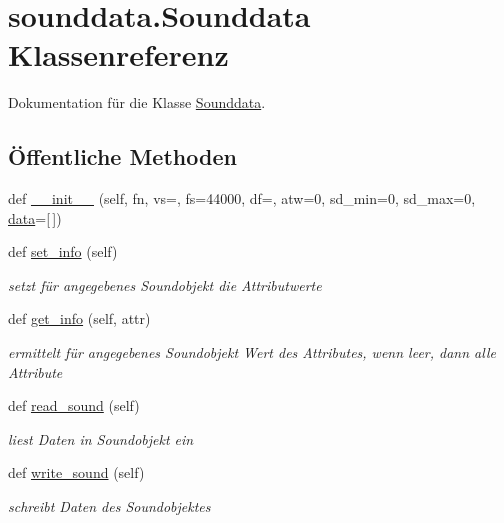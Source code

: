 \hypertarget{classsounddata_1_1_sounddata}{}\section{sounddata.\+Sounddata Klassenreferenz}
\label{classsounddata_1_1_sounddata}


Dokumentation für die Klasse \mbox{\hyperlink{classsounddata_1_1_sounddata}{Sounddata}}.  


\subsection*{Öffentliche Methoden}
\begin{DoxyCompactItemize}
\item 
def \mbox{\hyperlink{classsounddata_1_1_sounddata_a5bd8d7eebdf0bb0d137bfeb74b4c9fe6}{\+\_\+\+\_\+init\+\_\+\+\_\+}} (self, fn, vs=\textquotesingle{}\textquotesingle{}, fs=44000, df=\textquotesingle{}\textquotesingle{}, atw=0, sd\+\_\+min=0, sd\+\_\+max=0, \mbox{\hyperlink{classsounddata_1_1_sounddata_a64a625b1f08e5888cd34e14aad188cc0}{data}}=\mbox{[}$\,$\mbox{]})
\item 
def \mbox{\hyperlink{classsounddata_1_1_sounddata_a198de54d49c935b70cf8545980af1c26}{set\+\_\+info}} (self)
\begin{DoxyCompactList}\small\item\em setzt für angegebenes Soundobjekt die Attributwerte \end{DoxyCompactList}\item 
def \mbox{\hyperlink{classsounddata_1_1_sounddata_ac63cbec499bc5b28eced6ff6d0187376}{get\+\_\+info}} (self, attr)
\begin{DoxyCompactList}\small\item\em ermittelt für angegebenes Soundobjekt Wert des Attributes, wenn leer, dann alle Attribute \end{DoxyCompactList}\item 
def \mbox{\hyperlink{classsounddata_1_1_sounddata_a88a9e2052bdaa80e988bb0d4f5610495}{read\+\_\+sound}} (self)
\begin{DoxyCompactList}\small\item\em liest Daten in Soundobjekt ein \end{DoxyCompactList}\item 
def \mbox{\hyperlink{classsounddata_1_1_sounddata_abcf4edd6915714cc4db89ab787ab4007}{write\+\_\+sound}} (self)
\begin{DoxyCompactList}\small\item\em schreibt Daten des Soundobjektes \end{DoxyCompactList}\item 

\end{DoxyCompactItemize}
